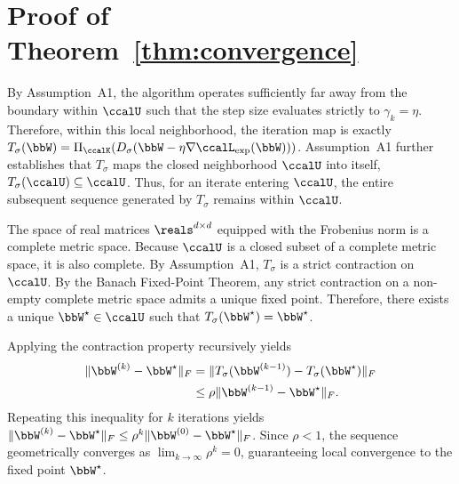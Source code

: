 \documentclass[conference]{IEEEtran}
\newcommand{\Lext}{\ccalL_{\mathrm{exp}}}
\begin{document}
\begin{IEEEproof}
	\end{IEEEproof}

    \section{Proof of Theorem~\ref{thm:convergence}}
    \label{app:proof_thm}

	\begin{IEEEproof}
		By Assumption~A1, the algorithm operates sufficiently far away from the boundary within $\ccalU$ such that the step size evaluates strictly to $\gamma_k = \eta$. Therefore, within this local neighborhood, the iteration map is exactly $T_\sigma(\bbW) = \Pi_{\ccalK}(D_\sigma(\bbW - \eta \nabla \Lext(\bbW)))$. Assumption~A1 further establishes that $T_\sigma$ maps the closed neighborhood $\ccalU$ into itself, $T_\sigma(\ccalU) \subseteq \ccalU$. Thus, for an iterate entering $\ccalU$, the entire subsequent sequence generated by $T_\sigma$ remains within $\ccalU$.

		The space of real matrices $\reals^{d \times d}$ equipped with the Frobenius norm is a complete metric space. Because $\ccalU$ is a closed subset of a complete metric space, it is also complete. By Assumption~A1, $T_\sigma$ is a strict contraction on $\ccalU$. By the Banach Fixed-Point Theorem, any strict contraction on a non-empty complete metric space admits a unique fixed point. Therefore, there exists a unique $\bbW^\star \in \ccalU$ such that $T_\sigma(\bbW^\star) = \bbW^\star$.
		
		Applying the contraction property recursively yields
        \begin{align*}
			\|\bbW^{(k)} - \bbW^\star\|_F ={} & \|T_\sigma(\bbW^{(k-1)}) - T_\sigma(\bbW^\star)\|_F\\
            \leq {} & \rho \|\bbW^{(k-1)} - \bbW^\star\|_F.
		\end{align*}
		Repeating this inequality for $k$ iterations yields $\|\bbW^{(k)} - \bbW^\star\|_F \leq \rho^k \|\bbW^{(0)} - \bbW^\star\|_F$. Since $\rho < 1$, the sequence geometrically converges as $\lim_{k \to \infty} \rho^k = 0$, guaranteeing local convergence to the fixed point $\bbW^\star$.
	\end{IEEEproof}
	

\end{document}
